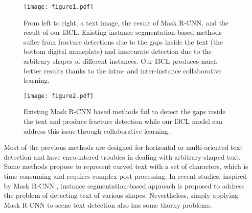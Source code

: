 \begin{figure}[ht]
  \centering
  \texttt{[image: figure1.pdf]}
  \caption{From left to right, a text image, the result of Mask R-CNN, and the result of our I3CL. Existing instance segmentation-based methods suffer from fracture detections due to the gaps inside the text (the bottom digital nameplate) and inaccurate detection due to the arbitrary shapes of different instances. Our I3CL produces much better results thanks to the intra- and inter-instance collaborative learning.}
  \label{fig1}
\end{figure}

\begin{figure}[ht]
  \centering
  \texttt{[image: figure2.pdf]}
  \caption{Existing Mask R-CNN based methods fail to detect the gaps inside the text and produce fracture detection while our I3CL model can address this issue through collaborative learning.}
  \label{fig2}
\end{figure}



Most of the previous methods \citep{east, textboxes, seglink} are designed for horizontal or multi-oriented text detection and have encountered troubles in dealing with arbitrary-shaped text. Some methods propose to represent curved text with a set of characters, which is time-consuming and requires complex post-processing. In recent studies, inspired by Mask R-CNN \citep{maskrcnn}, instance segmentation-based approach is proposed to address the problem of detecting text of various shapes. Nevertheless, simply applying Mask R-CNN to scene text detection also has some thorny problems.


